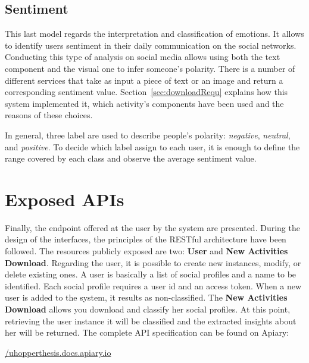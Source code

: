 \subsection{Sentiment}
This last model regards the interpretation and classification of emotions.
It allows to identify users sentiment in their daily communication on the social networks.
Conducting this type of analysis on social media allows using both the text component and the visual one to infer someone's polarity.
There is a number of different services that take as input a piece of text or an image and return a corresponding sentiment value.
Section~\ref{sec:downloadRequ} explains how this system implemented it, which activity's components have been used and the reasons of these choices.

In general, three label are used to describe people's polarity: \textit{negative}, \textit{neutral}, and \textit{positive}.
To decide which label assign to each user, it is enough to define the range covered by each class and observe the average sentiment value. 
\section{Exposed APIs}
Finally, the endpoint offered at the user by the system are presented. During the design of the interfaces, the principles of the RESTful architecture have been followed.
The resources publicly exposed are two: \textbf{User} and \textbf{New Activities Download}.
Regarding the user, it is possible to create new instances, modify, or delete existing ones.
A user is basically a list of social profiles and a name to be identified. Each social profile requires a user id and an access token.
When a new user is added to the system, it results as non-classified. The \textbf{New Activities Download} allows you download and classify her social profiles.
At this point, retrieving the user instance it will be classified and the extracted insights about her will be returned.
The complete API specification can be found on Apiary:

\begin{center}
\url{/uhopperthesis.docs.apiary.io}
\end{center}
